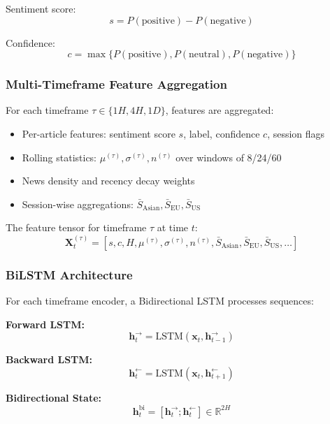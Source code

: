 \documentclass[conference]{IEEEtran}
\begin{document}
Sentiment score:
\begin{equation}
s = P(\text{positive}) - P(\text{negative})
\end{equation}

Confidence:
\begin{equation}
c = \max\{P(\text{positive}), P(\text{neutral}), P(\text{negative})\}
\end{equation}

\subsubsection{Multi-Timeframe Feature Aggregation}
For each timeframe $\tau \in \{1H, 4H, 1D\}$, features are aggregated:
\begin{itemize}
\item Per-article features: sentiment score $s$, label, confidence $c$, session flags
\item Rolling statistics: $\mu^{(\tau)}, \sigma^{(\tau)}, n^{(\tau)}$ over windows of 8/24/60
\item News density and recency decay weights
\item Session-wise aggregations: $\bar{S}_{\text{Asian}}, \bar{S}_{\text{EU}}, \bar{S}_{\text{US}}$
\end{itemize}

The feature tensor for timeframe $\tau$ at time $t$:
\begin{equation}
\mathbf{X}^{(\tau)}_t = [s, c, H, \mu^{(\tau)}, \sigma^{(\tau)}, n^{(\tau)}, \bar{S}_{\text{Asian}}, \bar{S}_{\text{EU}}, \bar{S}_{\text{US}}, \ldots]
\end{equation}

\subsubsection{BiLSTM Architecture}
For each timeframe encoder, a Bidirectional LSTM processes sequences:

\textbf{Forward LSTM:}
\begin{equation}
\mathbf{h}_t^{\rightarrow} = \text{LSTM}(\mathbf{x}_t, \mathbf{h}_{t-1}^{\rightarrow})
\end{equation}

\textbf{Backward LSTM:}
\begin{equation}
\mathbf{h}_t^{\leftarrow} = \text{LSTM}(\mathbf{x}_t, \mathbf{h}_{t+1}^{\leftarrow})
\end{equation}

\textbf{Bidirectional State:}
\begin{equation}
\mathbf{h}_t^{\text{bi}} = [\mathbf{h}_t^{\rightarrow}; \mathbf{h}_t^{\leftarrow}] \in \mathbb{R}^{2H}
\end{equation}
\end{document}
